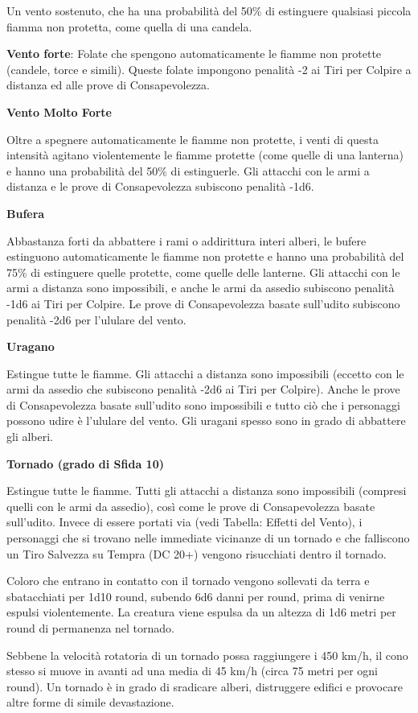 \begin{multicols}{2}
Un vento sostenuto, che ha una probabilità del 50\% di estinguere qualsiasi piccola fiamma non protetta, come quella di una candela.

\textbf{Vento forte}: Folate che spengono automaticamente le fiamme non protette (candele, torce e simili). Queste folate impongono penalità -2 ai Tiri per Colpire a distanza ed alle prove di Consapevolezza.

\textbf{Vento Molto Forte}

Oltre a spegnere automaticamente le fiamme non protette, i venti di questa intensità agitano violentemente le fiamme protette (come quelle di una lanterna) e hanno una probabilità del 50\% di estinguerle. Gli attacchi con le armi a distanza e le prove di Consapevolezza subiscono penalità -1d6.

\textbf{Bufera}

Abbastanza forti da abbattere i rami o addirittura interi alberi, le bufere estinguono automaticamente le fiamme non protette e hanno una probabilità del 75\% di estinguere quelle protette, come quelle delle lanterne. Gli attacchi con le armi a distanza sono impossibili, e anche le armi da assedio subiscono penalità -1d6 ai Tiri per Colpire. Le prove di Consapevolezza basate sull'udito subiscono penalità -2d6 per l'ululare del vento.

\textbf{Uragano}

Estingue tutte le fiamme. Gli attacchi a distanza sono impossibili (eccetto con le armi da assedio che subiscono penalità -2d6 ai Tiri per Colpire). Anche le prove di Consapevolezza basate sull'udito sono impossibili e tutto ciò che i personaggi possono udire è l'ululare del vento. Gli uragani spesso sono in grado di abbattere gli alberi.

\textbf{Tornado (grado di Sfida 10)}

Estingue tutte le fiamme. Tutti gli attacchi a distanza sono impossibili (compresi quelli con le armi da assedio), così come le prove di Consapevolezza basate sull'udito. Invece di essere portati via (vedi Tabella: Effetti del Vento), i personaggi che si trovano nelle immediate vicinanze di un tornado e che falliscono un Tiro Salvezza su Tempra (DC 20+) vengono risucchiati dentro il tornado.

Coloro che entrano in contatto con il tornado vengono sollevati da terra e sbatacchiati per 1d10 round, subendo 6d6 danni per round, prima di venirne espulsi violentemente. La creatura viene espulsa da un altezza di 1d6 metri per round di permanenza nel tornado.

Sebbene la velocità rotatoria di un tornado possa raggiungere i 450 km/h, il cono stesso si muove in avanti ad una media di 45 km/h (circa 75 metri per ogni round). Un tornado è in grado di sradicare alberi, distruggere edifici e provocare altre forme di simile devastazione.

\end{multicols}



